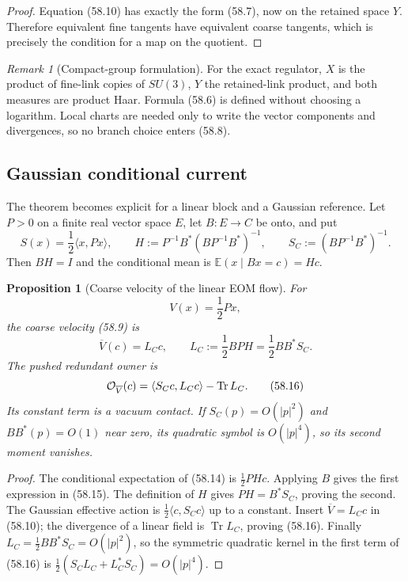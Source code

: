 \documentclass[11pt,oneside]{book}
\newtheorem{proposition}[theorem]{Proposition}
\theoremstyle{definition}
\theoremstyle{remark}
\newtheorem{remark}[theorem]{Remark}
\newcommand{\Tr}{\operatorname{Tr}}
\begin{document}
\begin{proof}
Equation (58.10) has exactly the form (58.7), now on the retained
space \(Y\).  Therefore equivalent fine tangents have equivalent
coarse tangents, which is precisely the condition for a map on the
quotient.
\end{proof}

\begin{remark}[Compact-group formulation]
\label{rem:e8v58-compact-group}
For the exact regulator, \(X\) is the product of fine-link copies
of \(SU(3)\), \(Y\) the retained-link product, and both measures are
product Haar.  Formula (58.6) is defined without choosing a
logarithm.  Local charts are needed only to write the vector
components and divergences, so no branch choice enters (58.8).
\end{remark}

\subsection{Gaussian conditional current}

The theorem becomes explicit for a linear block and a Gaussian
reference.  Let \(P>0\) on a finite real vector space \(E\), let
\(B:E\to C\) be onto, and put
\[
 S(x)=\frac12\langle x,Px\rangle,\qquad
 H:=P^{-1}B^*(BP^{-1}B^*)^{-1},\qquad
 S_C:=(BP^{-1}B^*)^{-1}.                                    \tag{58.13}
\]
Then \(BH=I\) and the conditional mean is
\(\mathbb E(x\mid Bx=c)=Hc\).

\begin{proposition}[Coarse velocity of the linear EOM flow]
\label{prop:e8v58-Gaussian-current}
For
\[
 V(x)=\frac12Px,                                              \tag{58.14}
\]
the coarse velocity (58.9) is
\[
 \boxed{
 \overline V(c)=L_Cc,\qquad
 L_C:=\frac12BPH=\frac12BB^*S_C.}                            \tag{58.15}
\]
The pushed redundant owner is
\[
 {\cal O}_{\overline V}(c)
 =\langle S_Cc,L_Cc\rangle-\Tr L_C.                           \tag{58.16}
\]
Its constant term is a vacuum contact.  If \(S_C(p)=O(|p|^2)\)
and \(BB^*(p)=O(1)\) near zero, its quadratic symbol is
\(O(|p|^4)\), so its second moment vanishes.
\end{proposition}

\begin{proof}
The conditional expectation of (58.14) is
\(\frac12PHc\).  Applying \(B\) gives the first expression in
(58.15).  The definition of \(H\) gives
\(PH=B^*S_C\), proving the second.  The Gaussian effective action
is \(\frac12\langle c,S_Cc\rangle\) up to a constant.
Insert \(\overline V=L_Cc\) in (58.10); the divergence of a linear
field is \(\Tr L_C\), proving (58.16).
Finally \(L_C=\frac12BB^*S_C=O(|p|^2)\), so the symmetric
quadratic kernel in the first term of (58.16) is
\(\frac12(S_CL_C+L_C^*S_C)=O(|p|^4)\).
\end{proof}
\end{document}
